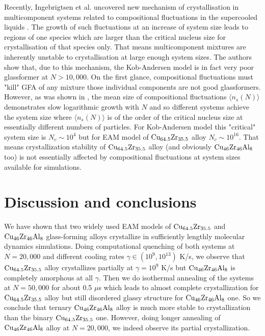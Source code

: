 \documentclass[jcp,twocolumn,superscriptaddress,floatfix,graphicx,showpacs]{revtex4-1}
\begin{document}
Recently, Ingebrigtsen et al. uncovered new mechanism of crystallisation in multicomponent systems related to compositional fluctuations in the supercooled liquids \cite{Ingebrigtsen2018crystallisation}. The growth of such fluctuations at an increase of system size leads to regions of one species which are larger than the critical nucleus size for crystallisation of that species only. That means multicomponent mixtures are inherently unstable to crystallisation at large enough system sizes. The authors show that, due to this mechanism, the Kob-Andersen model is in fact very poor glassformer at $N>10,000$. On the first glance, compositional fluctuations must "kill" GFA of any mixture those individual components are not good glassformers. However, as was shown in \cite{Ingebrigtsen2018crystallisation}, the mean size of compositional fluctuations $\langle n_s(N)\rangle$  demonstrates slow logarithmic growth with $N$ and so different systems achieve the system size where $\langle n_s(N)\rangle$ is of the order of the critical nucleus size at essentially different numbers of particles. For Kob-Andersen model this "critical" system size is $N_c \sim 10^4$ but for EAM model of ${\rm Cu_{64.5}Zr_{35.5}}$ alloy $N_c \sim 10^{16}$. That means crystallization stability of  ${\rm Cu_{64.5}Zr_{35.5}}$ alloy (and obviously ${\rm Cu_{46}Zr_{46}Al_{8}}$ too) is not essentially affected by compositional fluctuations at system sizes available for simulations.


\section{Discussion and conclusions\label{sec:discuss}}

We have shown that two widely used EAM models of ${\rm Cu_{64.5}Zr_{35.5}}$ and ${\rm Cu_{46}Zr_{46}Al_{8}}$ glass-forming alloys crystallize in sufficiently lengthly molecular dynamics simulations. Doing computational quenching of both systems at $N=20,000$ and different cooling rates $\gamma\in(10^9,10^{13})$ K/s, we observe that ${\rm Cu_{64.5}Zr_{35.5}}$ alloy crystallizes partially at $\gamma=10^9$ K/s but ${\rm Cu_{46}Zr_{46}Al_{8}}$ is completely amorphous at all $\gamma$. Then we do isothermal annealing of the systems at $N=50,000$ for about 0.5 $\mu$s which leads to almost complete crystallization for ${\rm Cu_{64.5}Zr_{35.5}}$ alloy but still disordered glassy structure for ${\rm Cu_{46}Zr_{46}Al_{8}}$ one. So we conclude that ternary ${\rm Cu_{46}Zr_{46}Al_{8}}$ alloy is much more stable to crystallization than the binary ${\rm Cu_{64.5}Zr_{35.5}}$ one. However, doing longer annealing of ${\rm Cu_{46}Zr_{46}Al_{8}}$ alloy at $N=20,000$, we indeed observe its partial crystallization.
\end{document}
